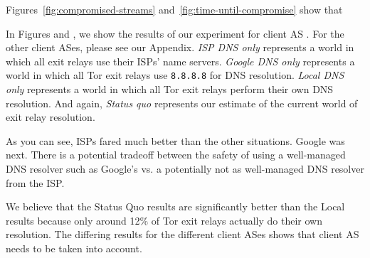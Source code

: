 Figures~\ref{fig:compromised-streams}
and~\ref{fig:time-until-compromise} show that

In Figures  and , we show the results of our experiment for client 
AS .  For the other client ASes, please see our Appendix. 
\emph{ISP DNS only} represents a world in which all exit relays use 
their ISPs' name servers. \emph{Google DNS only} represents a world in which all 
Tor exit relays use {\tt 8.8.8.8} for DNS resolution.  \emph{Local DNS only} represents 
a world in which all Tor exit relays perform their own DNS resolution.  And again, 
\emph{Status quo} represents our estimate of the current world of exit relay resolution.  

As you can see, ISPs fared much better than the other situations. Google was next. There is a potential 
tradeoff between the safety of using a well-managed DNS resolver such as Google's vs. 
a potentially not as well-managed DNS resolver from the ISP.  

We believe that the Status Quo results are significantly better than the 
Local results because only around 12\% of Tor exit relays actually do their own resolution.
The differing results for the different client ASes shows that client AS needs to be 
taken into account. 

